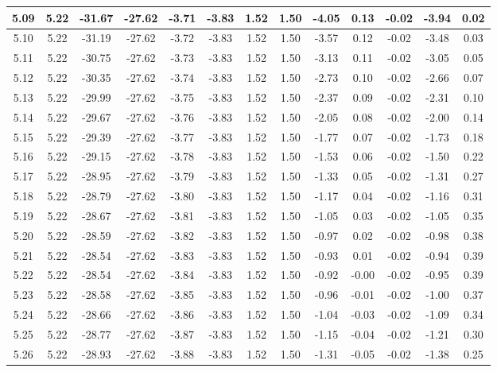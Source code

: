 \begin{table}[htbp]
\begin{adjustbox}{angle=90}
\begin{tabular}{|c|c|c|c|c|c|c|c|c|c|c|c|c|}
 5.09 & 5.22 & -31.67 & -27.62 & -3.71 & -3.83 & 1.52 & 1.50 & -4.05 & 0.13 & -0.02 & -3.94 & 0.02\\ \hline
 5.10 & 5.22 & -31.19 & -27.62 & -3.72 & -3.83 & 1.52 & 1.50 & -3.57 & 0.12 & -0.02 & -3.48 & 0.03\\ \hline
 5.11 & 5.22 & -30.75 & -27.62 & -3.73 & -3.83 & 1.52 & 1.50 & -3.13 & 0.11 & -0.02 & -3.05 & 0.05\\ \hline
 5.12 & 5.22 & -30.35 & -27.62 & -3.74 & -3.83 & 1.52 & 1.50 & -2.73 & 0.10 & -0.02 & -2.66 & 0.07\\ \hline
 5.13 & 5.22 & -29.99 & -27.62 & -3.75 & -3.83 & 1.52 & 1.50 & -2.37 & 0.09 & -0.02 & -2.31 & 0.10\\ \hline
 5.14 & 5.22 & -29.67 & -27.62 & -3.76 & -3.83 & 1.52 & 1.50 & -2.05 & 0.08 & -0.02 & -2.00 & 0.14\\ \hline
 5.15 & 5.22 & -29.39 & -27.62 & -3.77 & -3.83 & 1.52 & 1.50 & -1.77 & 0.07 & -0.02 & -1.73 & 0.18\\ \hline
 5.16 & 5.22 & -29.15 & -27.62 & -3.78 & -3.83 & 1.52 & 1.50 & -1.53 & 0.06 & -0.02 & -1.50 & 0.22\\ \hline
 5.17 & 5.22 & -28.95 & -27.62 & -3.79 & -3.83 & 1.52 & 1.50 & -1.33 & 0.05 & -0.02 & -1.31 & 0.27\\ \hline
 5.18 & 5.22 & -28.79 & -27.62 & -3.80 & -3.83 & 1.52 & 1.50 & -1.17 & 0.04 & -0.02 & -1.16 & 0.31\\ \hline
 5.19 & 5.22 & -28.67 & -27.62 & -3.81 & -3.83 & 1.52 & 1.50 & -1.05 & 0.03 & -0.02 & -1.05 & 0.35\\ \hline
 5.20 & 5.22 & -28.59 & -27.62 & -3.82 & -3.83 & 1.52 & 1.50 & -0.97 & 0.02 & -0.02 & -0.98 & 0.38\\ \hline
 5.21 & 5.22 & -28.54 & -27.62 & -3.83 & -3.83 & 1.52 & 1.50 & -0.93 & 0.01 & -0.02 & -0.94 & 0.39\\ \hline
 5.22 & 5.22 & -28.54 & -27.62 & -3.84 & -3.83 & 1.52 & 1.50 & -0.92 & -0.00 & -0.02 & -0.95 & 0.39\\ \hline
 5.23 & 5.22 & -28.58 & -27.62 & -3.85 & -3.83 & 1.52 & 1.50 & -0.96 & -0.01 & -0.02 & -1.00 & 0.37\\ \hline
 5.24 & 5.22 & -28.66 & -27.62 & -3.86 & -3.83 & 1.52 & 1.50 & -1.04 & -0.03 & -0.02 & -1.09 & 0.34\\ \hline
 5.25 & 5.22 & -28.77 & -27.62 & -3.87 & -3.83 & 1.52 & 1.50 & -1.15 & -0.04 & -0.02 & -1.21 & 0.30\\ \hline
 5.26 & 5.22 & -28.93 & -27.62 & -3.88 & -3.83 & 1.52 & 1.50 & -1.31 & -0.05 & -0.02 & -1.38 & 0.25\\ \hline

\end{tabular}
\end{adjustbox}
\end{table}

